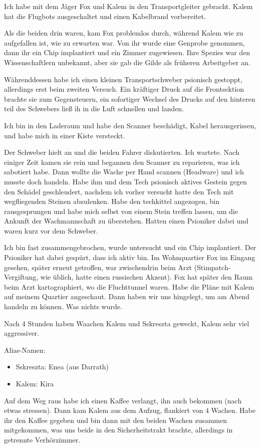 \documentclass[11pt]{article}
\begin{document}
Ich habe mit dem Jäger Fox und Kalem in den Transportgleiter gebracht.
Kalem hat die Flugbots ausgeschaltet und einen Kabelbrand vorbereitet.

Als die beiden drin waren, kam Fox problemlos durch, während Kalem wie
zu aufgefallen ist, wie zu erwarten war. Von ihr wurde eine Genprobe
genommen, dann ihr ein Chip implantiert und ein Zimmer zugewiesen. Ihre
Spezies war den Wissenschaftlern unbekannt, aber sie gab die Gilde als
früheren Arbeitgeber an.

Währenddessen habe ich einen kleinen Transportschweber psionisch
gestoppt, allerdings erst beim zweiten Versuch. Ein kräftiger Druck auf
die Frontsektion brachte sie zum Gegensteuern, ein sofortiger Wechsel
des Drucks auf den hinteren teil des Schwebers ließ ih in die Luft
schnellen und landen.

Ich bin in den Laderaum und habe den Scanner beschädigt, Kabel
herausgerissen, und habe mich in einer Kiste versteckt.

Der Schweber hielt an und die beiden Fahrer diskutierten. Ich wartete.
Nach einiger Zeit kamen sie rein und begannen den Scanner zu reparieren,
was ich sabotiert habe. Dann wollte die Wache per Hand scannen
(Headware) und ich musste doch handeln. Habe ihm und dem Tech psionisch
aktives Gestein gegen den Schädel geschleudert, nachdem ich vorher
versucht hatte den Tech mit wegfliegenden Steinen abzulenken. Habe den
techkittel angezogen, bin rausgesprungen und habe mich selbst von einem
Stein treffen lassen, um die Ankunft der Wachmannschaft zu überstehen.
Hatten einen Psioniker dabei und waren kurz vor dem Schweber.

Ich bin fast zusammengebrochen, wurde untersucht und ein Chip
implantiert. Der Psioniker hat dabei gespürt, dass ich aktiv bin. Im
Wohnquartier Fox im Eingang gesehen, später erneut getroffen, war
zwischendrin beim Arzt (Stimpatch-Vergiftung, wie üblich, hatte einen
russischen Akzent). Fox hat später den Raum beim Arzt kartographiert, wo
die Fluchttunnel waren. Habe die Pläne mit Kalem auf meinem Quartier
angeschaut. Dann haben wir uns hingelegt, um am Abend handeln zu können.
Was nichts wurde.

Nach 4 Stunden haben Waachen Kalem und Sskreszta geweckt, Kalem sehr
viel aggressiver.

Alias-Namen:

\begin{itemize}
\item
  Sskreszta: Enea (aus Darrath)
\item
  Kalem: Kira
\end{itemize}
Auf dem Weg raus habe ich einen Kaffee verlangt, ihn auch bekommen (nach
etwas stressen). Dann kam Kalem aus dem Aufzug, flankiert von 4 Wachen.
Habe ihr den Kaffee gegeben und bin dann mit den beiden Wachen zusammen
mitgekommen, was uns beide in den Sicherheitstrakt brachte, allerdings
in getrennte Verhörzimmer.
\end{document}

